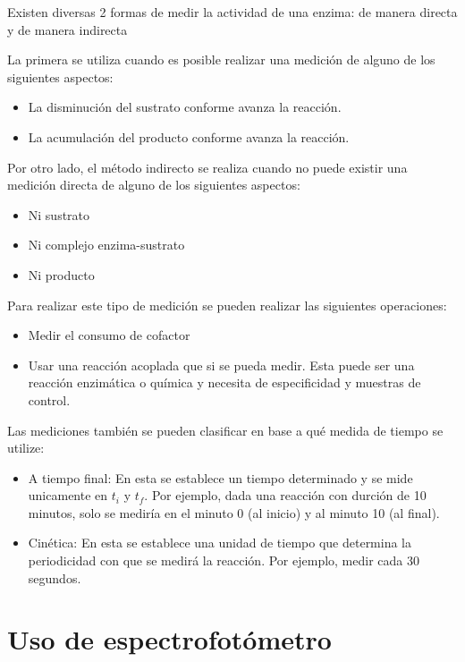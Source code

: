 Existen diversas 2 formas de medir la actividad de una enzima: de manera directa y de manera indirecta

La primera se utiliza cuando es posible realizar una medición de alguno de los siguientes aspectos:

\begin{itemize}
    \item La disminución del sustrato conforme avanza la reacción.
    \item La acumulación del producto conforme avanza la reacción.
\end{itemize}

Por otro lado, el método indirecto se realiza cuando no puede existir una medición directa de alguno de los siguientes aspectos:

\begin{itemize}
    \item Ni sustrato
    \item Ni complejo enzima-sustrato
    \item Ni producto
\end{itemize}

Para realizar este tipo de medición se pueden realizar las siguientes operaciones:

\begin{itemize}
    \item Medir el consumo de cofactor
    
    \item Usar una reacción acoplada que si se pueda medir. Esta puede ser una reacción enzimática o química y necesita de especificidad y muestras de control.
\end{itemize}

Las mediciones también se pueden clasificar en base a qué medida de tiempo se utilize:

\begin{itemize}
    \item A tiempo final: En esta se establece un tiempo determinado y se mide unicamente en $t_i$ y $t_f$. Por ejemplo, dada una reacción con durción de 10 minutos, solo se mediría en el minuto 0 (al inicio) y al minuto 10 (al final).
    \item Cinética: En esta se establece una unidad de tiempo que determina la periodicidad con que se medirá la reacción. Por ejemplo, medir cada 30 segundos. 
\end{itemize}

\section{Uso de espectrofotómetro}

